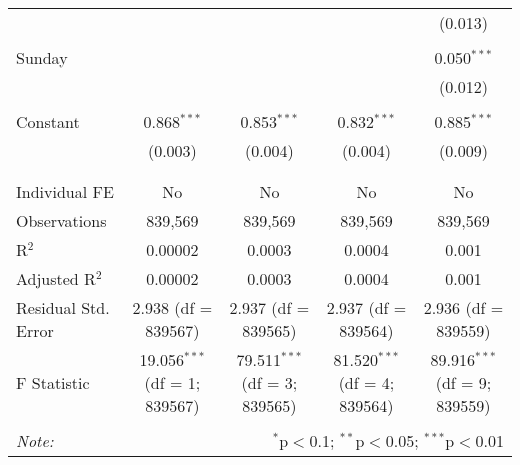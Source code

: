 \documentclass[
]{article}
\begin{document}
\begin{table}[!htbp]
{\begin{tabular}{@{\extracolsep{5pt}}lcccc}
  &  &  &  & (0.013) \\ 
  & & & & \\ 
 Sunday &  &  &  & 0.050$^{***}$ \\ 
  &  &  &  & (0.012) \\ 
  & & & & \\ 
 Constant & 0.868$^{***}$ & 0.853$^{***}$ & 0.832$^{***}$ & 0.885$^{***}$ \\ 
  & (0.003) & (0.004) & (0.004) & (0.009) \\ 
  & & & & \\ 
\hline \\[-1.8ex] 
Individual FE & No & No & No & No \\ 
Observations & 839,569 & 839,569 & 839,569 & 839,569 \\ 
R$^{2}$ & 0.00002 & 0.0003 & 0.0004 & 0.001 \\ 
Adjusted R$^{2}$ & 0.00002 & 0.0003 & 0.0004 & 0.001 \\ 
Residual Std. Error & 2.938 (df = 839567) & 2.937 (df = 839565) & 2.937 (df = 839564) & 2.936 (df = 839559) \\ 
F Statistic & 19.056$^{***}$ (df = 1; 839567) & 79.511$^{***}$ (df = 3; 839565) & 81.520$^{***}$ (df = 4; 839564) & 89.916$^{***}$ (df = 9; 839559) \\ 
\hline 
\hline \\[-1.8ex] 
\textit{Note:}  & \multicolumn{4}{r}{$^{*}$p$<$0.1; $^{**}$p$<$0.05; $^{***}$p$<$0.01} \\ 
\end{tabular}
} 
\end{table} 
\newpage
\end{document}
